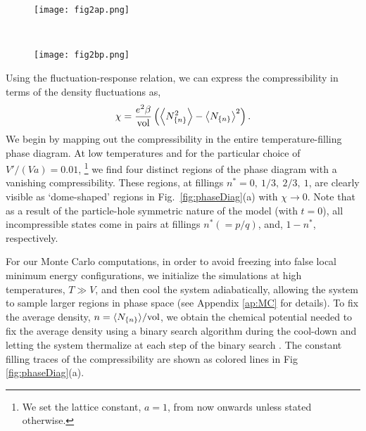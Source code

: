 \documentclass[aps,prx,onecolumn,amsmath,nofootinbib,amssymb,11pt]{revtex4-1}
\def \beq {\begin{eqnarray}}
\def \eeq {\end{eqnarray}}
\def \tn {\textnormal}
\begin{document}
{ 
\captionsetup[figure]{justification=centerlast}
 \begin{figure*}[t!]
    \centering
    \begin{subfigure}[t]{0.5\textwidth}
        \centering
        \texttt{[image: fig2ap.png]}
    \end{subfigure}%
    ~ 
    \begin{subfigure}[t]{0.5\textwidth}
        \centering
        \texttt{[image: fig2bp.png]}
    \end{subfigure}
    \caption{\textsf{(a) Compressibility as a function of temperature for $V'=0.01V$ for a range of chemical potentials. In the limit of low temperatures, four different incompressible states appear as domes over an extended range of $\mu$. The cooling curves corresponding to a fixed average density are shown as colored lines. (b) The rescaled compressibility calculated from the MC simulations shows distinct regimes of a $1/T$ behavior at high and low temperatures connected by a smooth crossover. (Error bars correspond to a $1\sigma$ standard deviation extracted from a bootstrap resampling; see Appendix \ref{ap:MC} for details). The solid and dashed lines correspond to asymptotic expansions for $\chi$ at high and low temperatures, respectively.}}
    \label{fig:phaseDiag} 
\end{figure*}


Using the fluctuation-response relation, we can express the compressibility in terms of the density fluctuations as,
\beq
\chi=\frac{e^2 \beta}{ \tn{vol} }\left(\left\langle N_{\{n\}}^{2}\right\rangle -\left\langle N_{\{n\}}\right\rangle ^{2}\right).
\label{eq:flucreschi}
\eeq
We begin by mapping out the compressibility in the entire temperature-filling phase diagram. At low temperatures and for the particular choice of $V'/(Va)=0.01$,   
{\footnote{\textsf{We set the lattice constant, $a=1$, from now onwards unless stated otherwise.}}} we find four distinct regions of the phase diagram with a vanishing compressibility. These regions, at fillings $n^*=0,~1/3,~2/3,~1$, are clearly visible as `dome-shaped' regions in Fig.~\ref{fig:phaseDiag}(a) with $\chi\rightarrow0$. Note that as a result of the particle-hole symmetric nature of the model (with $t=0$), all incompressible states come in pairs at fillings $n^*(=p/q)$, and, $1-n^*$, respectively. 



For our Monte Carlo computations, in order to avoid freezing into false local minimum energy configurations, we initialize the simulations at high temperatures, $T \gg V$, and then cool the system adiabatically, allowing the system to sample larger regions in phase space (see Appendix \ref{ap:MC} for details). To fix the average density, $n= \langle N_{\{ n\} }\rangle /\tn{vol}$, we obtain the chemical potential needed to fix the average density using a binary search algorithm during the cool-down and letting the system thermalize at each step of the binary search \cite{Binarysearch}. The constant filling traces of the compressibility are shown as colored lines in Fig \ref{fig:phaseDiag}(a).

}
\end{document}
